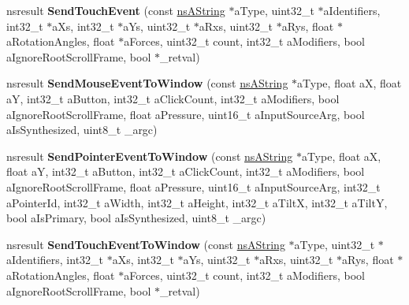 \begin{DoxyCompactItemize}
\item 
\mbox{\label{interfacens_i_d_o_m_window_utils_a39c9463ffbeae8562fc90d5799ca5324}} 
nsresult {\bfseries Send\+Touch\+Event} (const \hyperlink{structns_string_container}{ns\+A\+String} $\ast$a\+Type, uint32\+\_\+t $\ast$a\+Identifiers, int32\+\_\+t $\ast$a\+Xs, int32\+\_\+t $\ast$a\+Ys, uint32\+\_\+t $\ast$a\+Rxs, uint32\+\_\+t $\ast$a\+Rys, float $\ast$a\+Rotation\+Angles, float $\ast$a\+Forces, uint32\+\_\+t count, int32\+\_\+t a\+Modifiers, bool a\+Ignore\+Root\+Scroll\+Frame, bool $\ast$\+\_\+retval)
\item 
\mbox{\label{interfacens_i_d_o_m_window_utils_a5faa184752602e6311465ccef24417a1}} 
nsresult {\bfseries Send\+Mouse\+Event\+To\+Window} (const \hyperlink{structns_string_container}{ns\+A\+String} $\ast$a\+Type, float aX, float aY, int32\+\_\+t a\+Button, int32\+\_\+t a\+Click\+Count, int32\+\_\+t a\+Modifiers, bool a\+Ignore\+Root\+Scroll\+Frame, float a\+Pressure, uint16\+\_\+t a\+Input\+Source\+Arg, bool a\+Is\+Synthesized, uint8\+\_\+t \+\_\+argc)
\item 
\mbox{\label{interfacens_i_d_o_m_window_utils_a3c7270eeb58470ec253792bb0bfdfb6f}} 
nsresult {\bfseries Send\+Pointer\+Event\+To\+Window} (const \hyperlink{structns_string_container}{ns\+A\+String} $\ast$a\+Type, float aX, float aY, int32\+\_\+t a\+Button, int32\+\_\+t a\+Click\+Count, int32\+\_\+t a\+Modifiers, bool a\+Ignore\+Root\+Scroll\+Frame, float a\+Pressure, uint16\+\_\+t a\+Input\+Source\+Arg, int32\+\_\+t a\+Pointer\+Id, int32\+\_\+t a\+Width, int32\+\_\+t a\+Height, int32\+\_\+t a\+TiltX, int32\+\_\+t a\+TiltY, bool a\+Is\+Primary, bool a\+Is\+Synthesized, uint8\+\_\+t \+\_\+argc)
\item 
\mbox{\label{interfacens_i_d_o_m_window_utils_af6b2a52d3a034a6e50a177ebf33ecd48}} 
nsresult {\bfseries Send\+Touch\+Event\+To\+Window} (const \hyperlink{structns_string_container}{ns\+A\+String} $\ast$a\+Type, uint32\+\_\+t $\ast$a\+Identifiers, int32\+\_\+t $\ast$a\+Xs, int32\+\_\+t $\ast$a\+Ys, uint32\+\_\+t $\ast$a\+Rxs, uint32\+\_\+t $\ast$a\+Rys, float $\ast$a\+Rotation\+Angles, float $\ast$a\+Forces, uint32\+\_\+t count, int32\+\_\+t a\+Modifiers, bool a\+Ignore\+Root\+Scroll\+Frame, bool $\ast$\+\_\+retval)
\item 

\end{DoxyCompactItemize}
